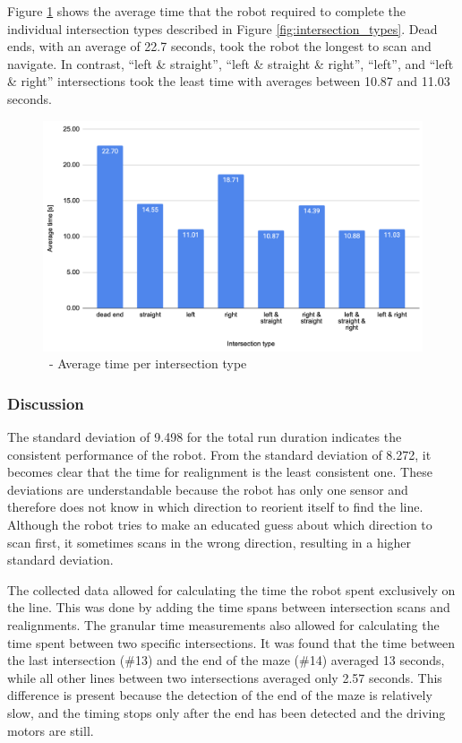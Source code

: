Figure \ref{fig:fixed-intersection-times} shows the average time that the robot required to complete the individual intersection types described in Figure \ref{fig:intersection_types}. Dead ends, with an average of 22.7 seconds, took the robot the longest to scan and navigate. In contrast, “left \& straight”, “left \& straight \& right”, “left”, and “left \& right” intersections took the least time with averages between 10.87 and 11.03 seconds.

\begin{figure}[hbt!]
    \centering
    \includegraphics[width=\textwidth]{resources/fixed-intersection-times.png}
    \caption{\FixRob~- Average time per intersection type}
    \label{fig:fixed-intersection-times}
\end{figure}

\subsubsection{Discussion} \label{sec:fixed_discussion}
The standard deviation of 9.498 for the total run duration indicates the consistent performance of the robot. From the standard deviation of 8.272, it becomes clear that the time for realignment is the least consistent one. These deviations are understandable because the robot has only one sensor and therefore does not know in which direction to reorient itself to find the line. Although the robot tries to make an educated guess about which direction to scan first, it sometimes scans in the wrong direction, resulting in a higher standard deviation.

The collected data allowed for calculating the time the robot spent exclusively on the line. This was done by adding the time spans between intersection scans and realignments. The granular time measurements also allowed for calculating the time spent between two specific intersections. It was found that the time between the last intersection (\#13) and the end of the maze (\#14) averaged 13 seconds, while all other lines between two intersections averaged only 2.57 seconds. This difference is present because the detection of the end of the maze is relatively slow, and the timing stops only after the end has been detected and the driving motors are still.

